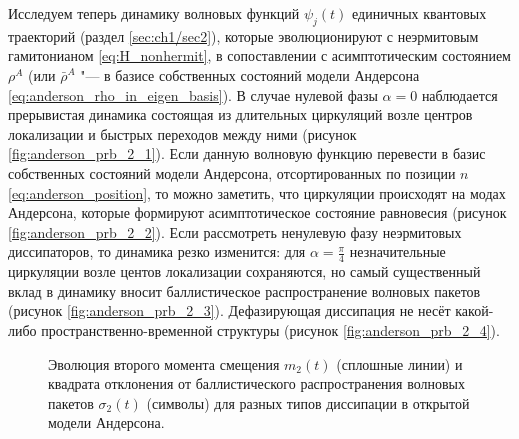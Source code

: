 Исследуем теперь динамику волновых функций \(\psi_j(t)\) единичных квантовых траекторий (раздел \cref{sec:ch1/sec2}), которые эволюционируют с неэрмитовым гамитонианом \cref{eq:H_nonhermit}, в сопоставлении с асимптотическим состоянием \(\rho^A\) (или \(\bar{\rho}^A\) "--- в базисе собственных состояний модели Андерсона \cref{eq:anderson_rho_in_eigen_basis}). 
В случае нулевой фазы \(\alpha=0\) наблюдается прерывистая динамика состоящая из длительных циркуляций возле центров локализации и быстрых переходов между ними (рисунок \cref{fig:anderson_prb_2_1}). 
Если данную волновую функцию перевести в базис собственных состояний модели Андерсона,  отсортированных по позиции \(n\) \cref{eq:anderson_position}, то можно заметить, что циркуляции происходят на модах Андерсона, которые формируют асимптотическое состояние равновесия \cite{Yusipov2017} (рисунок \cref{fig:anderson_prb_2_2}). 
Если рассмотреть ненулевую фазу неэрмитовых диссипаторов, то динамика резко изменится: для \(\alpha=\frac{\pi}{4}\) незначительные циркуляции возле центов локализации сохраняются, но самый существенный вклад в динамику вносит баллистическое распространение волновых пакетов (рисунок \cref{fig:anderson_prb_2_3}). 
Дефазирующая диссипация не несёт какой-либо пространственно-временной структуры (рисунок \cref{fig:anderson_prb_2_4}).

\begin{figure}[h]
	\caption{
		Эволюция второго момента смещения \(m_2(t)\) (сплошные линии) и квадрата отклонения от баллистического распространения волновых пакетов \(\sigma_2(t)\) (символы) для разных типов диссипации в открытой модели Андерсона.
	}
	\label{fig:anderson_prb_3}
\end{figure}

